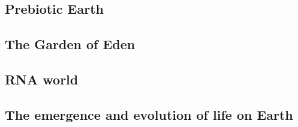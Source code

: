 \subsection{Prebiotic Earth}

\subsection{The Garden of Eden}


\subsection{RNA world}

\subsection{The emergence and evolution of life on Earth}
%
%

